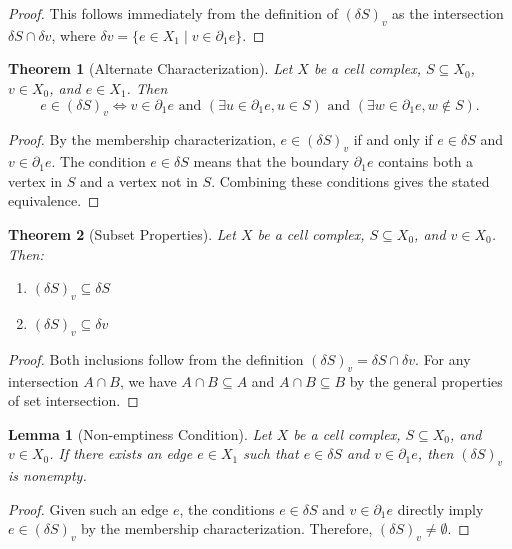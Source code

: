 \documentclass[11pt]{article}
\theoremstyle{plain}
\newtheorem*{theorem}{Theorem}
\newtheorem*{lemma}{Lemma}
\theoremstyle{definition}
\theoremstyle{remark}
\begin{document}
\begin{proof}
This follows immediately from the definition of $(\delta S)_v$ as the intersection $\delta S \cap \delta v$, where $\delta v = \{e \in X_1 \mid v \in \partial_1 e\}$.
\end{proof}

\begin{theorem}[Alternate Characterization]
Let $X$ be a cell complex, $S \subseteq X_0$, $v \in X_0$, and $e \in X_1$. Then
\[
e \in (\delta S)_v \Longleftrightarrow v \in \partial_1 e \text{ and } (\exists u \in \partial_1 e, u \in S) \text{ and } (\exists w \in \partial_1 e, w \notin S).
\]
\end{theorem}

\begin{proof}
By the membership characterization, $e \in (\delta S)_v$ if and only if $e \in \delta S$ and $v \in \partial_1 e$. The condition $e \in \delta S$ means that the boundary $\partial_1 e$ contains both a vertex in $S$ and a vertex not in $S$. Combining these conditions gives the stated equivalence.
\end{proof}

\begin{theorem}[Subset Properties]
Let $X$ be a cell complex, $S \subseteq X_0$, and $v \in X_0$. Then:
\begin{enumerate}
\item $(\delta S)_v \subseteq \delta S$
\item $(\delta S)_v \subseteq \delta v$
\end{enumerate}
\end{theorem}

\begin{proof}
Both inclusions follow from the definition $(\delta S)_v = \delta S \cap \delta v$. For any intersection $A \cap B$, we have $A \cap B \subseteq A$ and $A \cap B \subseteq B$ by the general properties of set intersection.
\end{proof}

\begin{lemma}[Non-emptiness Condition]
Let $X$ be a cell complex, $S \subseteq X_0$, and $v \in X_0$. If there exists an edge $e \in X_1$ such that $e \in \delta S$ and $v \in \partial_1 e$, then $(\delta S)_v$ is nonempty.
\end{lemma}

\begin{proof}
Given such an edge $e$, the conditions $e \in \delta S$ and $v \in \partial_1 e$ directly imply $e \in (\delta S)_v$ by the membership characterization. Therefore, $(\delta S)_v \neq \emptyset$.
\end{proof}
\end{document}
